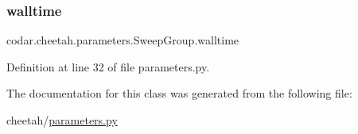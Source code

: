 \subsubsection{\texorpdfstring{walltime}{walltime}}
{\footnotesize\ttfamily codar.\+cheetah.\+parameters.\+Sweep\+Group.\+walltime}



Definition at line 32 of file parameters.\+py.



The documentation for this class was generated from the following file\+:\begin{DoxyCompactItemize}
\item 
cheetah/\hyperlink{parameters_8py}{parameters.\+py}\end{DoxyCompactItemize}
